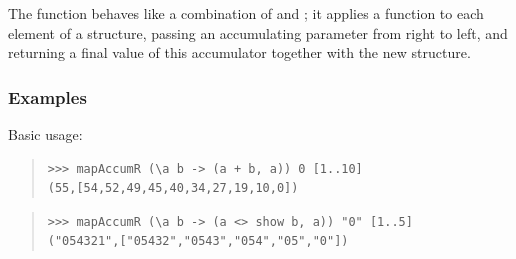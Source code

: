 \begin{haddockdesc}
\item[\begin{tabular}{@{}l}
mapAccumR :: Traversable t => (s -> a -> (s, b)) -> s -> t a -> (s, t b)
\end{tabular}]
{\haddockbegindoc
The  function behaves like a combination of 
 and ; it applies a function to each element of a structure,
 passing an accumulating parameter from right to left, and returning
 a final value of this accumulator together with the new structure.\par
\subsubsection*{\textbf{Examples}}
Basic usage:\par
\begin{quote}
{\haddockverb\begin{verbatim}
>>> mapAccumR (\a b -> (a + b, a)) 0 [1..10]
(55,[54,52,49,45,40,34,27,19,10,0])

\end{verbatim}}
\end{quote}
\begin{quote}
{\haddockverb\begin{verbatim}
>>> mapAccumR (\a b -> (a <> show b, a)) "0" [1..5]
("054321",["05432","0543","054","05","0"])

\end{verbatim}}
\end{quote}}
\end{haddockdesc}
